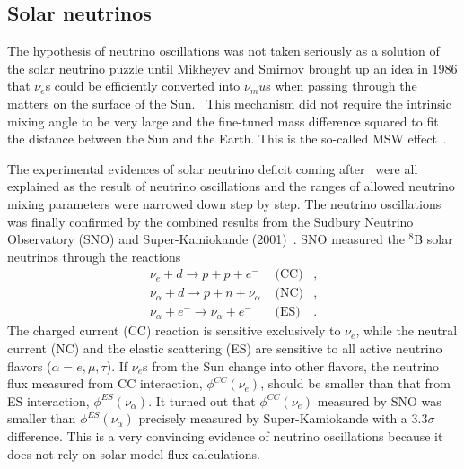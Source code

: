 \subsection{Solar neutrinos}
\label{sec:solar}
The hypothesis of neutrino oscillations was not taken seriously as a solution of the solar neutrino puzzle until Mikheyev and Smirnov brought up an idea in 1986 that $\nu_e$s could be efficiently converted into $\nu_mu$s when passing through the matters on the surface of the Sun.~\cite{Mik86} This mechanism did not require the intrinsic mixing angle to be very large and the fine-tuned mass difference squared to fit the distance between the Sun and the Earth. This is the so-called MSW effect~\cite{Mik86,Wol78}.

The experimental evidences of solar neutrino deficit coming after~\cite{Hir89,Aba91,Ans92} were all explained as the result of neutrino oscillations and the ranges of allowed neutrino mixing parameters were narrowed down step by step. The neutrino oscillations was finally confirmed by the combined results from the Sudbury Neutrino Observatory (SNO) and Super-Kamiokande (2001)~\cite{Ahm01,Fuk01}. SNO measured the $^8$B solar neutrinos through the reactions
\begin{eqnarray*}
  \nu_e + d \rightarrow p + p + e^- &\mbox{\ \ \ \ \ \ (CC)}&,\\
  \nu_\alpha + d \rightarrow p + n + \nu_\alpha &\mbox{\ \ \ \ \ \     (NC)}&,\\
  \nu_\alpha + e^- \rightarrow \nu_\alpha + e^- &\mbox{\ \ \ \ \ \     (ES)}&.
\end{eqnarray*}
The charged current (CC) reaction is sensitive exclusively to $\nu_e$, while the neutral current (NC) and the elastic scattering (ES) are sensitive to all active neutrino flavors ($\alpha = e, \mu, \tau$). If $\nu_e$s from the Sun change into other flavors, the neutrino flux measured from CC interaction, $\phi^{CC}(\nu_e)$, should be smaller than that from ES interaction, $\phi^{ES}(\nu_\alpha)$. It turned out that $\phi^{CC}(\nu_e)$ measured by SNO was smaller than $\phi^{ES}(\nu_\alpha)$ precisely measured by Super-Kamiokande with a $3.3\sigma$ difference. This is a very convincing evidence of neutrino oscillations because it does not rely on solar model flux calculations.

